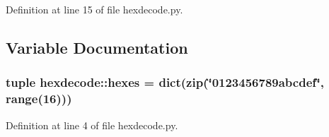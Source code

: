 Definition at line 15 of file hexdecode.py.



\subsection{Variable Documentation}
\hypertarget{namespacehexdecode_accc606ed3055f10007241f2203f4d79b}{
\subsubsection[{hexes}]{\setlength{\rightskip}{0pt plus 5cm}tuple {\bf hexdecode::hexes} = dict(zip(\char`\"{}0123456789abcdef\char`\"{}, range(16)))}}
\label{namespacehexdecode_accc606ed3055f10007241f2203f4d79b}


Definition at line 4 of file hexdecode.py.


